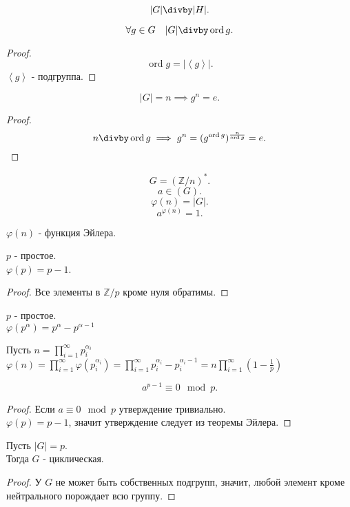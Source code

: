 \documentclass[11pt, oneside]{article}   	%
\DeclareMathOperator{\odr}{ord}
\begin{document}
    \begin{tlemma}
        \[ |G|\divby |H| .\]
    \end{tlemma}
    \begin{tlemma}
        \[ \forall{g\in G}\quad |G| \divby \odr g  .\]
        \begin{proof}
            \[ \odr g = |\left<g\right>| .\]
            $\left<g\right>$ - подгруппа.
        \end{proof}
    \end{tlemma}
    \begin{tlemma}
        \[ |G| = n \implies g^{n} = e .\]
        \begin{proof}
            \[ n\divby \odr g \implies g^{n} = (g^{\odr g})^{\frac{n}{\odr g}} = e .\] 
        \end{proof}
    \end{tlemma}
    \begin{tlemma}
        \[ G = \left( \mathbb{Z}/n \right)^{*}  .\] 
        \[ a\in \left(G\right)  .\]
        \[ \varphi(n) = |G| .\]
        \[ a^{\varphi(n)} = 1 .\]
    \end{tlemma}
    \begin{definition}
        $\varphi(n)$ - функция Эйлера.
    \end{definition}
    \begin{dlemma}
        $p$ - простое.\\
        $\varphi(p) = p-1$.
        \begin{proof}
            Все элементы в $\mathbb{Z}/p$ кроме нуля обратимы.
        \end{proof}
    \end{dlemma}
    \begin{dlemma}
        $p$ - простое.\\
        $\varphi(p^{\alpha}) = p^{\alpha} - p^{\alpha-1}$
    \end{dlemma}
    \begin{dlemma}
        Пусть $n = \prod\limits_{i=1}^{\infty} p_i^{\alpha_i}$\\
        $\varphi(n) = \prod\limits_{i=1}^{\infty} \varphi(p_i^{\alpha_i}) = \prod\limits_{i=1}^{\infty} p_i^{\alpha_i} - p_i^{\alpha_i - 1} = n\prod\limits_{i=1}^{\infty}(1-\frac{1}{p})   $
    \end{dlemma}
    \begin{theorem}
        \[ a^{p-1} \equiv 0\mod p .\] 
        \begin{proof}
            Если $a\equiv 0\mod p$ утверждение тривиально.\\
            $\varphi(p) = p-1$, значит утверждение следует из теоремы Эйлера. 
        \end{proof}
    \end{theorem}
    \begin{theorem}
        Пусть $|G| = p$.\\
        Тогда $G$ - циклическая.\\
        \begin{proof}
            У $G$ не может быть собственных подгрупп, значит, любой элемент кроме нейтрального порождает всю группу.
        \end{proof}
    \end{theorem}
\end{document}
